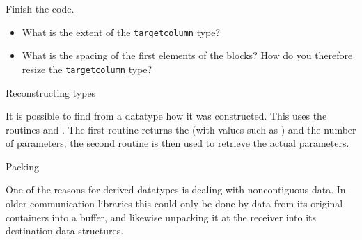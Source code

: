 \begin{exercise}
  Finish the code.
  \begin{itemize}
  \item
    What is the extent of the \lstinline{targetcolumn} type?
  \item What is the spacing of the first elements of the blocks? How
    do you therefore resize the \lstinline{targetcolumn} type?
  \end{itemize}
\end{exercise}


 {Reconstructing types}

It is possible to find from a datatype how it was constructed.
This uses the routines
 and
.
The first routine returns the 
(with values such as )
and the number of parameters;
the second routine is then used to retrieve the actual parameters.

\begin{comment}
  \Level 1 {Datatype signatures}
  \label{sec:signature}
  \index{datatype!signature|(}

  With the primitive types it pretty much went
  without saying that if the sender sends an array of doubles, the
  receiver had to declare the datatype also as doubles. With derived
  types that is no longer the case: the sender and receiver can declare
  a different datatype for the send and receive buffer, as long as these
  have the same \indextermbus{datatype}{signature}.

  The signature of a datatype is the internal representation of that
  datatype. For instance, if the sender declares a datatype consisting
  of two doubles, and it sends four elements of that type, the receiver
  can receive it as two elements of a type consisting of four doubles.

  You can also look at the signature as the form `under the hood' in which MPI
  sends the data.

  \index{datatype!signature|)}
\end{comment}

 {Packing}
\label{sec:pack}

One of the reasons for derived datatypes is dealing with noncontiguous data.
In older communication libraries this could only be done by  data
from its original containers into a buffer, and likewise unpacking it at the
receiver into its destination data structures.

